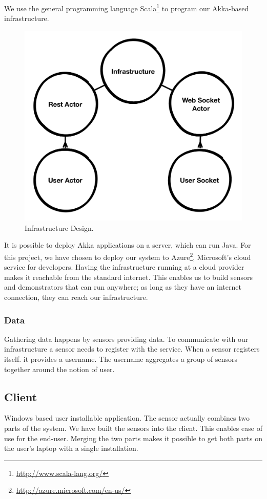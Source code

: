 \documentclass{sigchi}
\begin{document}
We use the general programming language Scala\footnote{\url{http://www.scala-lang.org/}} to program our Akka-based infrastructure.


\begin{figure}[H]
  \centering
  \includegraphics[width=\columnwidth]{figures/infrastructure_design.pdf}
  \caption{Infrastructure Design.}
  \label{fig:infrastructure}
\end{figure}

It is possible to deploy Akka applications on a server, which can run Java.
For this project, we have chosen to deploy our system to Azure\footnote{\url{http://azure.microsoft.com/en-us/}}, Microsoft's cloud service for developers.
Having the infrastructure running at a cloud provider makes it reachable from the standard internet.
This enables us to build sensors and demonstrators that can run anywhere; as long as they have an internet connection, they can reach our infrastructure.

\subsubsection{Data}
Gathering data happens by sensors providing data.
To communicate with our infrastructure a sensor needs to register with the service.
When a sensor registers itself. it provides a username.
The username aggregates a group of sensors together around the notion of user.

\subsection{Client}
Windows based user installable application.
The sensor actually combines two parts of the system.
We have built the sensors into the client.
This enables ease of use for the end-user.
Merging the two parts makes it possible to get both parts on the user's laptop with a single installation.
\end{document}

